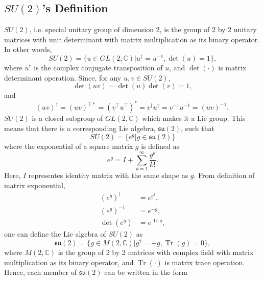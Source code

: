 \documentclass[preprint, 12pt]{revtex4-2}
\DeclareMathOperator{\Tr}{Tr}
\numberwithin{equation}{section}
\begin{document}
\subsection{$SU(2)$'s Definition}
$SU(2)$, i.e. special unitary group of dimension 2, is the group of 2 by 2 unitary matrices with unit determinant with matrix multiplication as its binary operator. In other words,
\begin{equation}\label{eq:SU2}
    SU(2) = \{u \in GL(2, \mathbb{C})|u^\dagger=u^{-1}, \det(u) = 1\},
\end{equation}    
where $u^\dagger$ is the complex conjugate transposition of $u$, and $\det(\cdot)$ is matrix determinant operation. Since, for any $u, v \in SU(2)$,
\begin{equation}\label{eq:determinant identity}
    \det(uv) = \det(u)\det(v) = 1,
\end{equation}
and
\begin{equation}\label{eq:unitary closed}
    (uv)^\dagger = (uv)^{\top\ast} = (v^\top u^\top)^\ast = v^\dagger u^\dagger = v^{-1}u^{-1} = (uv)^{-1},
\end{equation}
$SU(2)$ is a closed subgroup of $GL(2, \mathbb{C})$ which makes it a Lie group. This means that there is a corresponding Lie algebra, $\mathfrak{su(2)}$, such that 
\begin{equation}\label{eq:SU2 Lie group}
    SU(2) = \{e^g|g \in \mathfrak{su(2)}\}
\end{equation}
where the exponential of a square matrix $g$ is defined as
\begin{equation}\label{eq:matrix exponential}
    e^g = I + \sum_{k=1}^{\infty}\dfrac{g^k}{k!}.
\end{equation}
Here, $I$ representes identity matrix with the same shape as $g$. From definition of matrix exponential,
\begin{equation}\label{eq:matrix exponential properties}
    \begin{aligned}
        (e^g)^\dagger &= e^{g^\dagger}, \\
        (e^g)^{-1} &= e^{-g}, \\
        \det(e^g) &= e^{\Tr g},
    \end{aligned}
\end{equation}
one can define the Lie algebra of $SU(2)$ as
\begin{equation}\label{eq:su2}
    \mathfrak{su(2)} = \{g \in M(2, \mathbb{C})|g^\dagger=-g, \Tr(g) = 0\},
\end{equation}
where $M(2,\mathbb{C})$ is the group of 2 by 2 matrices with complex field with matrix multiplication as its binary operator, and $\Tr(\cdot)$ is matrix trace operation. Hence, each member of $\mathfrak{su(2)}$ can be written in the form
\end{document}

